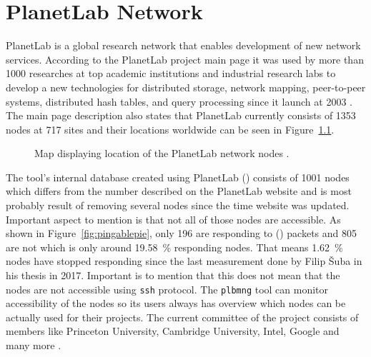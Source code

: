 \chapter{PlanetLab Network}
\label{chapter:planetlabnetwork}
PlanetLab is a global research network that enables development of new network services. According to the PlanetLab project main page it was used by more than 1000 researches at top academic institutions and industrial research labs to develop a new technologies for distributed storage, network mapping, peer-to-peer systems, distributed hash tables, and query processing since it launch at 2003 \cite{planetlabmain}. The main page description also states that PlanetLab currently consists of 1353 nodes at 717 sites and their locations worldwide can be seen in Figure~\ref{fig:location}.

\begin{figure}[H]
	\centering
	\caption{Map displaying location of the PlanetLab network nodes \cite{OpenStreetMap}.}
	\label{fig:location}
\end{figure}

The tool's internal database created using PlanetLab  () consists of 1001 nodes which differs from the number described on the PlanetLab website and is most probably result of removing several nodes since the time website was updated. Important aspect to mention is that not all of those nodes are accessible. As shown in Figure~\ref{fig:pingablepie}, only 196 are responding to  () packets and 805 are not which is only around \SI{19.58}{\percent} responding nodes. That means \SI{1.62}{\percent} nodes have stopped responding since the last measurement done by Filip Šuba in his thesis \cite{suba1} in 2017. Important is to mention that this does not mean that the nodes are not accessible using \texttt{ssh} protocol. The \texttt{plbmng} tool can monitor accessibility of the nodes so its users always has overview which nodes can be actually used for their projects. The current committee of the project consists of members like Princeton University, Cambridge University, Intel, Google and many more \cite{planetlabmain}.\\

